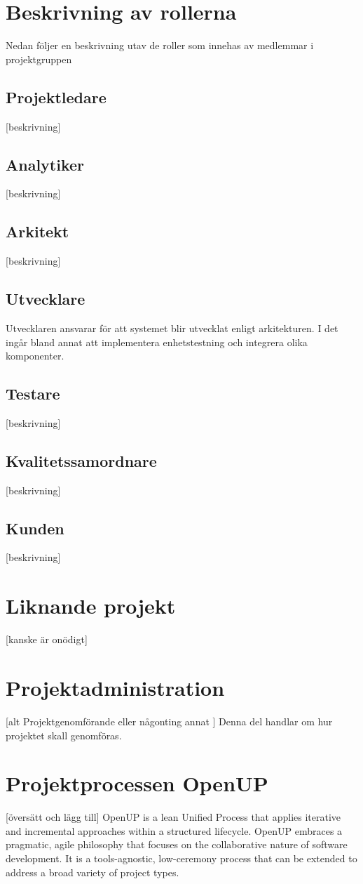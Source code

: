 \section{Beskrivning av rollerna}
Nedan följer en beskrivning utav de roller som innehas av medlemmar i projektgruppen
\subsection*{Projektledare}
[beskrivning]
\subsection*{Analytiker}
[beskrivning]
\subsection*{Arkitekt}
[beskrivning]
\subsection*{Utvecklare}
Utvecklaren ansvarar för att systemet blir utvecklat enligt arkitekturen. I det ingår bland annat att implementera enhetstestning och integrera olika komponenter.
\subsection*{Testare}
[beskrivning]
\subsection*{Kvalitetssamordnare}
[beskrivning]
\subsection*{Kunden}
[beskrivning]
\section{Liknande projekt}
[kanske är onödigt]
\section{Projektadministration}
[alt Projektgenomförande eller någonting annat ]
Denna del handlar om hur projektet skall genomföras.
\section{Projektprocessen OpenUP}
[översätt och lägg till]
OpenUP is a lean Unified Process that applies iterative and incremental approaches within a structured lifecycle. OpenUP embraces a pragmatic, agile philosophy that focuses on the collaborative nature of software development. It is a tools-agnostic, low-ceremony process that can be extended to address a broad variety of project types.
